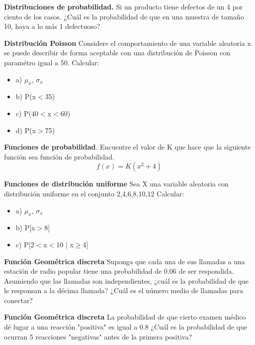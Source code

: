 \documentclass{../oxmathproblems}
\begin{document}
\begin{questions}


\miquestion \textbf {Distribuciones de probabilidad.} Si un producto tiene defectos de un 4 por ciento de los casos. ¿Cuál es la probabilidad de que en una muestra de tamaño 10, haya a lo más 1 defectuoso?


\miquestion \textbf {Distribución Poisson} Considere el comportamiento de una variable aleatoria x se puede describir de forma aceptable con una distribución de Poisson con paramétro igual a 50. 
Calcular: 
\begin{itemize}
\item a) $\mu_x$, $\sigma_x$
\item  b) P(x$<$35)
\item  c) P(40$<$x$<$60)
\item  d) P(x$>$75)
\end{itemize}

\miquestion \textbf{Funciones de probabilidad}.  Encuentre el valor de K que hace que la siguiente función sea función de probabilidad. 
 $$f(x) = K(x^2 + 4)$$

	
\miquestion \textbf{Funciones de distribución uniforme} Sea X una variable aleatoria con distribución uniforme en el conjunto {2,4,6,8,10,12}
Calcular: 
\begin{itemize}
\item  a) $\mu_x$, $\sigma_x$
\item  b) P[x$>$8]
\item  c) P[2$<$x$<$10 $\mid$ x$\geq$4]
\end{itemize}
	
\miquestion \textbf {Función Geométrica discreta} Suponga que cada una de sus llamadas a una estación de radio popular tiene una probabilidad de 0.06 de ser respondida. Asumiendo que las  llamadas son independientes, ¿cuál es la probabilidad de que le responsan a la décima llamada? ¿Cuál es el número medio de llamadas para conectar?

\miquestion \textbf {Función Geométrica discreta} La probabilidad de que cierto examen médico dé lugar a una reacción "positiva" es igual a 0.8 ¿Cuál es la probabilidad de que ocurran 5 reacciones "negativas" antes de la primera positiva?



\end{questions}
\end{document}
